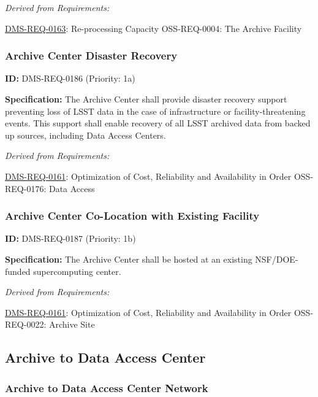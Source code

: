 \documentclass[SE,toc,lsstdraft]{lsstdoc}
\begin{document}
\emph{Derived from Requirements:}

\hyperref[DMS-REQ-0163]{DMS-REQ-0163}:
Re-processing Capacity \newline
OSS-REQ-0004:
The Archive Facility \newline

\subsubsection{Archive Center Disaster Recovery}

\label{DMS-REQ-0186}
\textbf{ID:} DMS-REQ-0186 (Priority: 1a)

\textbf{Specification:} The Archive Center shall provide disaster recovery support preventing loss of LSST data in the case of infrastructure or facility-threatening events.  This support shall enable recovery of all LSST archived data from backed up sources, including Data Access Centers.

\emph{Derived from Requirements:}

\hyperref[DMS-REQ-0161]{DMS-REQ-0161}:
Optimization of Cost, Reliability and Availability in Order \newline
OSS-REQ-0176:
Data Access \newline

\subsubsection{Archive Center Co-Location with Existing Facility}

\label{DMS-REQ-0187}
\textbf{ID:} DMS-REQ-0187 (Priority: 1b)

\textbf{Specification:} The Archive Center shall be hosted at an existing NSF/DOE-funded supercomputing center.

\emph{Derived from Requirements:}

\hyperref[DMS-REQ-0161]{DMS-REQ-0161}:
Optimization of Cost, Reliability and Availability in Order \newline
OSS-REQ-0022:
Archive Site \newline

\subsection{Archive to Data Access Center}

\subsubsection{Archive to Data Access Center Network}
\end{document}
